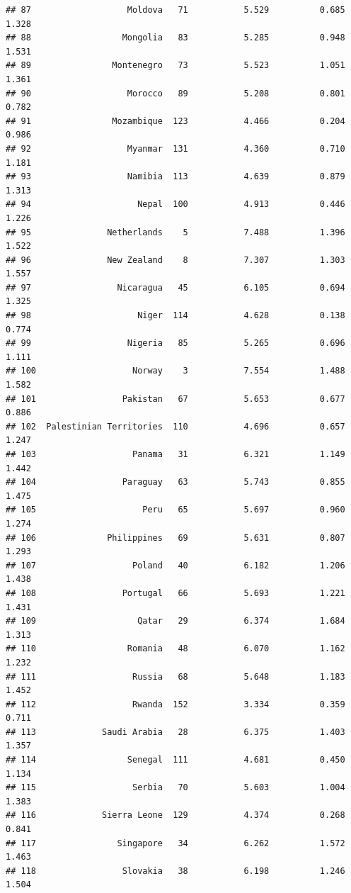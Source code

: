 \documentclass[]{article}
\begin{document}
\begin{verbatim}
## 87                   Moldova   71           5.529          0.685          1.328
## 88                  Mongolia   83           5.285          0.948          1.531
## 89                Montenegro   73           5.523          1.051          1.361
## 90                   Morocco   89           5.208          0.801          0.782
## 91                Mozambique  123           4.466          0.204          0.986
## 92                   Myanmar  131           4.360          0.710          1.181
## 93                   Namibia  113           4.639          0.879          1.313
## 94                     Nepal  100           4.913          0.446          1.226
## 95               Netherlands    5           7.488          1.396          1.522
## 96               New Zealand    8           7.307          1.303          1.557
## 97                 Nicaragua   45           6.105          0.694          1.325
## 98                     Niger  114           4.628          0.138          0.774
## 99                   Nigeria   85           5.265          0.696          1.111
## 100                   Norway    3           7.554          1.488          1.582
## 101                 Pakistan   67           5.653          0.677          0.886
## 102  Palestinian Territories  110           4.696          0.657          1.247
## 103                   Panama   31           6.321          1.149          1.442
## 104                 Paraguay   63           5.743          0.855          1.475
## 105                     Peru   65           5.697          0.960          1.274
## 106              Philippines   69           5.631          0.807          1.293
## 107                   Poland   40           6.182          1.206          1.438
## 108                 Portugal   66           5.693          1.221          1.431
## 109                    Qatar   29           6.374          1.684          1.313
## 110                  Romania   48           6.070          1.162          1.232
## 111                   Russia   68           5.648          1.183          1.452
## 112                   Rwanda  152           3.334          0.359          0.711
## 113             Saudi Arabia   28           6.375          1.403          1.357
## 114                  Senegal  111           4.681          0.450          1.134
## 115                   Serbia   70           5.603          1.004          1.383
## 116             Sierra Leone  129           4.374          0.268          0.841
## 117                Singapore   34           6.262          1.572          1.463
## 118                 Slovakia   38           6.198          1.246          1.504

\end{verbatim}
\end{document}
